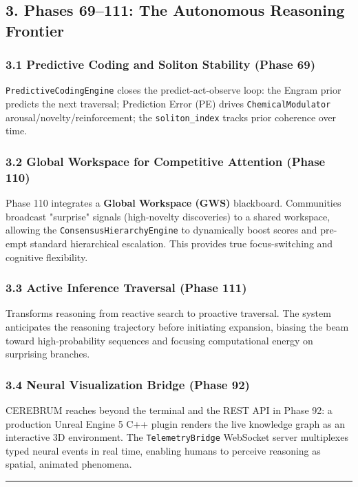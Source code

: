 \subsection*{3. Phases 69--111: The Autonomous Reasoning Frontier}

\subsubsection*{3.1 Predictive Coding and Soliton Stability (Phase 69)}
\texttt{PredictiveCodingEngine} closes the predict-act-observe loop: the Engram prior predicts the next traversal; Prediction Error (PE) drives \texttt{ChemicalModulator} arousal/novelty/reinforcement; the \texttt{soliton\_index} tracks prior coherence over time.

\subsubsection*{3.2 Global Workspace for Competitive Attention (Phase 110)}
Phase 110 integrates a \textbf{Global Workspace (GWS)} blackboard. Communities broadcast "surprise" signals (high-novelty discoveries) to a shared workspace, allowing the \texttt{ConsensusHierarchyEngine} to dynamically boost scores and pre-empt standard hierarchical escalation. This provides true focus-switching and cognitive flexibility.

\subsubsection*{3.3 Active Inference Traversal (Phase 111)}
Transforms reasoning from reactive search to proactive traversal. The system anticipates the reasoning trajectory before initiating expansion, biasing the beam toward high-probability sequences and focusing computational energy on surprising branches.

\subsubsection*{3.4 Neural Visualization Bridge (Phase 92)}
CEREBRUM reaches beyond the terminal and the REST API in Phase 92: a production Unreal Engine 5 C++ plugin renders the live knowledge graph as an interactive 3D environment. The \texttt{TelemetryBridge} WebSocket server multiplexes typed neural events in real time, enabling humans to perceive reasoning as spatial, animated phenomena.

\medskip\noindent\rule{\linewidth}{0.4pt}\medskip

